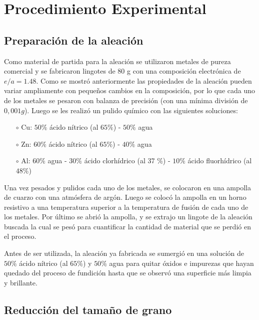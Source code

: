 \documentclass[a4paper,12pt,fleqn,twoside,openany]{book}
\begin{document}
\chapter{Procedimiento Experimental}



\section{Preparación de la aleación} \label{preparacion_aleacion}


Como material de partida para la aleación se utilizaron metales de pureza comercial y se fabricaron lingotes de 80 g con una composición electrónica de 
$e/a=1.48$. Como se mostró anteriormente las propiedades de la aleación pueden variar ampliamente 
con pequeños cambios en la composición, por lo que cada uno de los metales se pesaron con balanza de precisión (con una mínima división de $0,001g$). 
Luego se les realizó un pulido químico con las siguientes soluciones:
\begin{itemize}
 \item[$\circ$] Cu: $50 \%$ ácido nítrico (al $65 \%$) - $50 \%$ agua
 \item[$\circ$] Zn: $60 \%$ ácido nítrico (al $65 \%$) - $40 \%$ agua
 \item[$\circ$] Al: $60 \%$ agua - $30 \%$ ácido clorhídrico (al 37 \%) - $10 \%$ ácido fluorhídrico (al $48 \%$)
\end{itemize}

Una vez pesados y pulidos cada uno de los metales, se colocaron en una ampolla de cuarzo con una atmósfera de argón. Luego se colocó la ampolla en 
un horno resistivo a una temperatura superior a la temperatura de fusión de cada uno de los metales. Por último se abrió la ampolla, y se extrajo un 
lingote de la aleación buscada la cual se pesó para cuantificar la cantidad de material que se perdió en el proceso.  

Antes de ser utilizada, la aleación ya fabricada se sumergió en una solución de $50 \%$ ácido nítrico (al $65 \%$) y 
$50 \%$ agua para quitar óxidos e impurezas que hayan quedado del proceso de fundición hasta que se observó una superficie más limpia y brillante.

\section{Reducción del tamaño de grano} \label{FabClavos}
\end{document}
